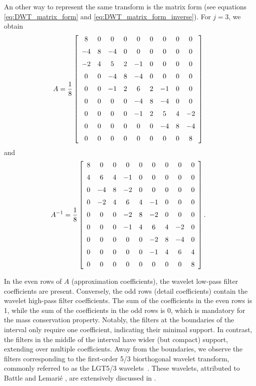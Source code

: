 An other way to represent the same transform is the matrix form (see equations \ref{eq:DWT_matrix_form} and \ref{eq:DWT_matrix_form_inverse}).
For $j=3$, we obtain
\begin{equation}
A=\frac{1}{8}\left[\begin{array}{ccccccccc}
8 & 0 & 0 & 0 & 0 & 0 & 0 & 0 & 0\\
\noalign{\medskip}-4 & 8 & -4 & 0 & 0 & 0 & 0 & 0 & 0\\
\noalign{\medskip}-2 & 4 & 5 & 2 & -1 & 0 & 0 & 0 & 0\\
\noalign{\medskip}0 & 0 & -4 & 8 & -4 & 0 & 0 & 0 & 0\\
\noalign{\medskip}0 & 0 & -1 & 2 & 6 & 2 & -1 & 0 & 0\\
\noalign{\medskip}0 & 0 & 0 & 0 & -4 & 8 & -4 & 0 & 0\\
\noalign{\medskip}0 & 0 & 0 & 0 & -1 & 2 & 5 & 4 & -2\\
\noalign{\medskip}0 & 0 & 0 & 0 & 0 & 0 & -4 & 8 & -4\\
\noalign{\medskip}0 & 0 & 0 & 0 & 0 & 0 & 0 & 0 & 8
\end{array}\right]
\end{equation}
and
\begin{equation}
A^{-1}=\frac{1}{8}\left[\begin{array}{ccccccccc}
8 & 0 & 0 & 0 & 0 & 0 & 0 & 0 & 0\\
\noalign{\medskip}4 & 6 & 4 & -1 & 0 & 0 & 0 & 0 & 0\\
\noalign{\medskip}0 & -4 & 8 & -2 & 0 & 0 & 0 & 0 & 0\\
\noalign{\medskip}0 & -2 & 4 & 6 & 4 & -1 & 0 & 0 & 0\\
\noalign{\medskip}0 & 0 & 0 & -2 & 8 & -2 & 0 & 0 & 0\\
\noalign{\medskip}0 & 0 & 0 & -1 & 4 & 6 & 4 & -2 & 0\\
\noalign{\medskip}0 & 0 & 0 & 0 & 0 & -2 & 8 & -4 & 0\\
\noalign{\medskip}0 & 0 & 0 & 0 & 0 & -1 & 4 & 6 & 4\\
\noalign{\medskip}0 & 0 & 0 & 0 & 0 & 0 & 0 & 0 & 8
\end{array}\right].
\end{equation}

In the even rows of $A$ (approximation coefficients), the wavelet low-pass filter coefficients are present.
Conversely, the odd rows (detail coefficients) contain the wavelet high-pass filter coefficients.
The sum of the coefficients in the even rows is 1, while the sum of the coefficients in the odd rows is 0, which is mandatory for the mass conservation property.
Notably, the filters at the boundaries of the interval only require one coefficient, indicating their minimal support.
In contrast, the filters in the middle of the interval have wider (but compact) support, extending over multiple coefficients.
Away from the boundaries, we observe the filters corresponding to the first-order 5/3 biorthogonal wavelet transform, commonly referred to as the LGT5/3 wavelets~\cite{le1988sub}.
These wavelets, attributed to Battle and Lemarié \cite{daubechies1992tenp253_254}, are extensively discussed in \cite{cohen1992biorthogonal}. %

